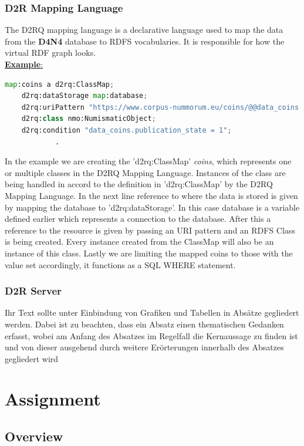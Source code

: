 \documentclass[12pt, oneside]{article}
\begin{document}
\subsubsection{D2R Mapping Language}
The D2RQ mapping language is a declarative language used to map the data from the \textbf{D4N4} database to RDFS vocabularies. It is responsible for how the virtual RDF graph looks.\\
\underline{\textbf{Example}:}
\begin{center}
\begin{lstlisting}[language=Python]
map:coins a d2rq:ClassMap;
	d2rq:dataStorage map:database;
	d2rq:uriPattern "https://www.corpus-nummorum.eu/coins/@@data_coins.id@@";
	d2rq:class nmo:NumismaticObject;
	d2rq:condition "data_coins.publication_state = 1";
			.
\end{lstlisting}
\end{center}

In the example we are creating the 'd2rq:ClassMap' \textit{coins}, which represents one or multiple classes in the D2RQ Mapping Language. Instances of the class are being handled in accord to the definition in 'd2rq:ClassMap' by the D2RQ Mapping Language. In the next line reference to where the data is stored is given by mapping the database to 'd2rq:dataStorage'. In this case database is a variable defined earlier which represents a connection to the database. After this a reference to the resource is given by passing an URI pattern and an RDFS Class is being created. Every instance created from the ClassMap will also be an instance of this class. Lastly we are limiting the mapped coins to those with the value set accordingly, it functions as a SQL WHERE statement.
\subsubsection{D2R Server}
Ihr Text sollte unter Einbindung von Grafiken und Tabellen in Absätze gegliedert werden. Dabei ist zu beachten, dass ein Absatz einen thematischen Gedanken erfasst, wobei am Anfang des Absatzes im Regelfall die Kernaussage zu finden ist und von dieser ausgehend durch weitere Erörterungen innerhalb des Absatzes gegliedert wird

\newpage

\section{Assignment}
\subsection{Overview}
\end{document}
